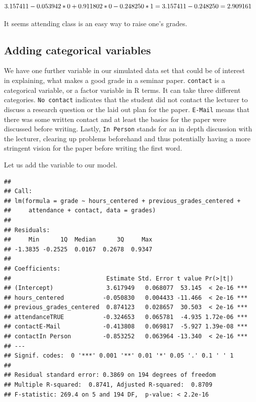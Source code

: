 \documentclass[
]{book}
\begin{document}
\[3.157411 - 0.053942*0 + 0.911802*0 - 0.248250 * 1 = 3.157411 - 0.248250 \\
= 2.909161\]

It seems attending class is an easy way to raise one's grades.

\hypertarget{adding-categorical-variables}{%
\subsection{Adding categorical variables}\label{adding-categorical-variables}}

We have one further variable in our simulated data set that could be of interest
in explaining, what makes a good grade in a seminar paper. \texttt{contact} is a
categorical variable, or a factor variable in R terms.
It can take three different categories. \texttt{No\ contact} indicates that
the student did not contact the lecturer to discuss a research question or the
laid out plan for the paper. \texttt{E-Mail} means that there was some written contact
and at least the basics for the paper were discussed before writing. Lastly,
\texttt{In\ Person} stands for an in depth discussion with the lecturer, clearing up
problems beforehand and thus potentially having a more stringent vision for the
paper before writing the first word.

Let us add the variable to our model.

\begin{verbatim}
## 
## Call:
## lm(formula = grade ~ hours_centered + previous_grades_centered + 
##     attendance + contact, data = grades)
## 
## Residuals:
##     Min      1Q  Median      3Q     Max 
## -1.3835 -0.2525  0.0167  0.2678  0.9347 
## 
## Coefficients:
##                           Estimate Std. Error t value Pr(>|t|)    
## (Intercept)               3.617949   0.068077  53.145  < 2e-16 ***
## hours_centered           -0.050830   0.004433 -11.466  < 2e-16 ***
## previous_grades_centered  0.874123   0.028657  30.503  < 2e-16 ***
## attendanceTRUE           -0.324653   0.065781  -4.935 1.72e-06 ***
## contactE-Mail            -0.413808   0.069817  -5.927 1.39e-08 ***
## contactIn Person         -0.853252   0.063964 -13.340  < 2e-16 ***
## ---
## Signif. codes:  0 '***' 0.001 '**' 0.01 '*' 0.05 '.' 0.1 ' ' 1
## 
## Residual standard error: 0.3869 on 194 degrees of freedom
## Multiple R-squared:  0.8741, Adjusted R-squared:  0.8709 
## F-statistic: 269.4 on 5 and 194 DF,  p-value: < 2.2e-16
\end{verbatim}
\end{document}
